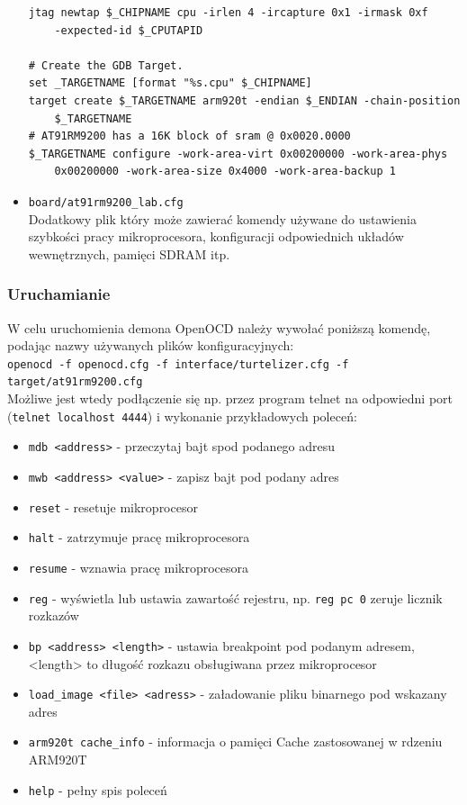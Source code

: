 \documentclass[a4paper,12pt]{book}
\begin{document}
\begin{itemize}
\begin{lstlisting}[basicstyle={\footnotesize\ttfamily}]
jtag newtap $_CHIPNAME cpu -irlen 4 -ircapture 0x1 -irmask 0xf 
	-expected-id $_CPUTAPID

# Create the GDB Target.
set _TARGETNAME [format "%s.cpu" $_CHIPNAME]
target create $_TARGETNAME arm920t -endian $_ENDIAN -chain-position 
	$_TARGETNAME 
# AT91RM9200 has a 16K block of sram @ 0x0020.0000
$_TARGETNAME configure -work-area-virt 0x00200000 -work-area-phys 
	0x00200000 -work-area-size 0x4000 -work-area-backup 1
							\end{lstlisting}
						\item{\texttt{board/at91rm9200\_lab.cfg}}\\
							Dodatkowy plik który może zawierać komendy używane do ustawienia szybkości pracy mikroprocesora, konfiguracji odpowiednich układów wewnętrznych, pamięci SDRAM itp.
					\end{itemize}
				\subsubsection{Uruchamianie}
					W celu uruchomienia demona OpenOCD należy wywołać poniższą komendę, podając nazwy używanych plików konfiguracyjnych:\\
					\texttt{openocd -f openocd.cfg -f interface/turtelizer.cfg -f target/at91rm9200.cfg}\\
					Możliwe jest wtedy podłączenie się np. przez program telnet na odpowiedni port (\texttt{telnet localhost 4444}) i wykonanie przykładowych poleceń:
					\begin{itemize}
						\item\texttt{mdb <address>} - przeczytaj bajt spod podanego adresu
						\item\texttt{mwb <address> <value>} - zapisz bajt pod podany adres
						\item\texttt{reset} - resetuje mikroprocesor
						\item\texttt{halt} - zatrzymuje pracę mikroprocesora
						\item\texttt{resume} - wznawia pracę mikroprocesora
						\item\texttt{reg} - wyświetla lub ustawia zawartość rejestru, np. \texttt{reg pc 0} zeruje licznik rozkazów
						\item\texttt{bp <address> <length>} - ustawia breakpoint pod podanym adresem, <length> to długość rozkazu obsługiwana przez mikroprocesor
						\item\texttt{load\_image <file> <adress>} - załadowanie pliku binarnego pod wskazany adres
						\item\texttt{arm920t cache\_info} - informacja o pamięci Cache zastosowanej w rdzeniu ARM920T
						\item\texttt{help} - pełny spis poleceń
					\end{itemize}
				
\end{document}
